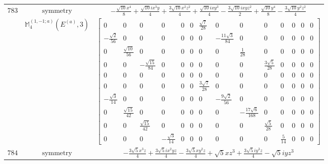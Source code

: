 \documentclass[fleqn,8pt,landscape]{jsarticle}
\begin{document}
\begin{longtable}{ccc}
$ 783 $ & $ \text{symmetry} $ & $ - \frac{\sqrt{10} x^{4}}{8} + \frac{\sqrt{10} i x^{3} y}{4} + \frac{3 \sqrt{10} x^{2} z^{2}}{4} + \frac{\sqrt{10} i x y^{3}}{4} - \frac{3 \sqrt{10} i x y z^{2}}{2} + \frac{\sqrt{10} y^{4}}{8} - \frac{3 \sqrt{10} y^{2} z^{2}}{4} $ \\
$  $ & $ \mathbb{M}_{4}^{(1,-1;a)}(E^{(a)},3) $ & $ \begin{bmatrix} 0 & 0 & 0 & 0 & 0 & 0 & \frac{\sqrt{7}}{28} & 0 & 0 & 0 & 0 & 0 & 0 & 0 \\ - \frac{\sqrt{2}}{56} & 0 & 0 & 0 & 0 & 0 & 0 & - \frac{11 \sqrt{3}}{84} & 0 & 0 & 0 & 0 & 0 & 0 \\ 0 & \frac{\sqrt{10}}{56} & 0 & 0 & 0 & 0 & 0 & 0 & \frac{1}{28} & 0 & 0 & 0 & 0 & 0 \\ 0 & 0 & - \frac{\sqrt{15}}{84} & 0 & 0 & 0 & 0 & 0 & 0 & \frac{3 \sqrt{5}}{28} & 0 & 0 & 0 & 0 \\ 0 & 0 & 0 & 0 & 0 & 0 & 0 & 0 & 0 & 0 & 0 & 0 & 0 & 0 \\ 0 & 0 & 0 & 0 & 0 & 0 & \frac{3 \sqrt{7}}{28} & 0 & 0 & 0 & 0 & 0 & 0 & 0 \\ - \frac{\sqrt{3}}{14} & 0 & 0 & 0 & 0 & 0 & 0 & - \frac{9 \sqrt{2}}{56} & 0 & 0 & 0 & 0 & 0 & 0 \\ 0 & \frac{\sqrt{15}}{42} & 0 & 0 & 0 & 0 & 0 & 0 & - \frac{17 \sqrt{6}}{168} & 0 & 0 & 0 & 0 & 0 \\ 0 & 0 & \frac{\sqrt{15}}{42} & 0 & 0 & 0 & 0 & 0 & 0 & \frac{\sqrt{5}}{28} & 0 & 0 & 0 & 0 \\ 0 & 0 & 0 & - \frac{\sqrt{3}}{14} & 0 & 0 & 0 & 0 & 0 & 0 & \frac{5}{14} & 0 & 0 & 0 \end{bmatrix} $ \\ \hline
$ 784 $ & $ \text{symmetry} $ & $ - \frac{3 \sqrt{5} x^{3} z}{4} + \frac{3 \sqrt{5} i x^{2} y z}{4} - \frac{3 \sqrt{5} x y^{2} z}{4} + \sqrt{5} x z^{3} + \frac{3 \sqrt{5} i y^{3} z}{4} - \sqrt{5} i y z^{3} $ \\

\end{longtable}
\end{document}
